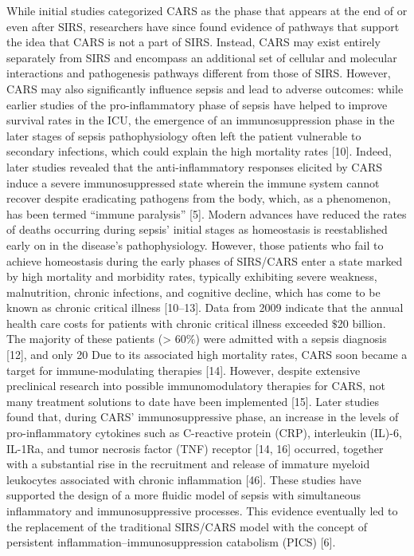 While initial studies categorized CARS as the phase that appears at the end of or even after SIRS, researchers have since found evidence of pathways that support the idea that CARS is not a part of SIRS. Instead, CARS may exist entirely separately from SIRS and encompass an additional set of cellular and molecular interactions and pathogenesis pathways different from those of SIRS. However, CARS may also significantly influence sepsis and lead to adverse outcomes: while earlier studies of the pro-inflammatory phase of sepsis have helped to improve survival rates in the ICU, the emergence of an immunosuppression phase in the later stages of sepsis pathophysiology often left the patient vulnerable to secondary infections, which could explain the high mortality rates [10]. Indeed, later studies revealed that the anti-inflammatory responses elicited by CARS induce a severe immunosuppressed state wherein the immune system cannot recover despite eradicating pathogens from the body, which, as a phenomenon, has been termed “immune paralysis” [5].
Modern advances have reduced the rates of deaths occurring during sepsis' initial stages as homeostasis is reestablished early on in the disease's pathophysiology. However, those patients who fail to achieve homeostasis during the early phases of SIRS/CARS enter a state marked by high mortality and morbidity rates, typically exhibiting severe weakness, malnutrition, chronic infections, and cognitive decline, which has come to be known as chronic critical illness [10–13].
Data from 2009 indicate that the annual health care costs for patients with chronic critical illness exceeded $\$$20 billion. The majority of these patients (> 60$\%$) were admitted with a sepsis diagnosis [12], and only 20%
Due to its associated high mortality rates, CARS soon became a target for immune-modulating therapies [14]. However, despite extensive preclinical research into possible immunomodulatory therapies for CARS, not many treatment solutions to date have been implemented [15]. Later studies found that, during CARS’ immunosuppressive phase, an increase in the levels of pro-inflammatory cytokines such as C-reactive protein (CRP), interleukin (IL)-6, IL-1Ra, and tumor necrosis factor (TNF) receptor [14, 16] occurred, together with a substantial rise in the recruitment and release of immature myeloid leukocytes associated with chronic inflammation [46]. These studies have supported the design of a more fluidic model of sepsis with simultaneous inflammatory and immunosuppressive processes. This evidence eventually led to the replacement of the traditional SIRS/CARS model with the concept of persistent inflammation–immunosuppression catabolism (PICS) [6].
